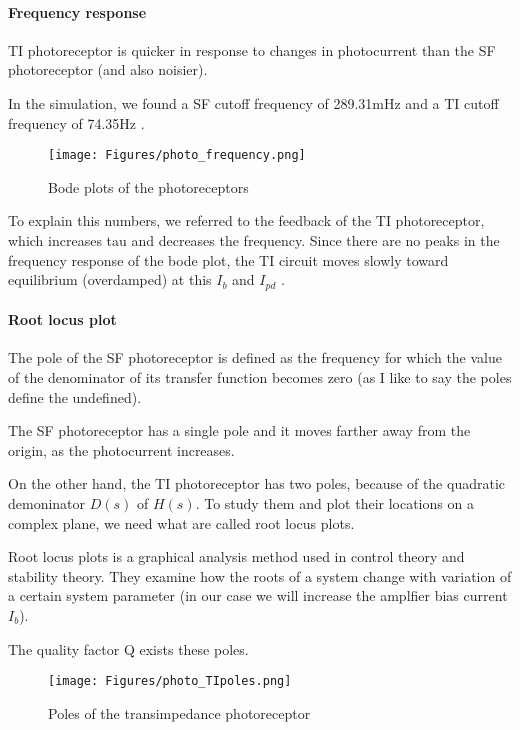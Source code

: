 \paragraph{Frequency response}

 TI photoreceptor is quicker in response to changes in photocurrent than the SF photoreceptor (and also noisier). 
 
In the simulation, we found a SF cutoff frequency of 289.31mHz and a TI cutoff frequency of 74.35Hz .

\begin{figure}[H]
    \centering
    \texttt{[image: Figures/photo\_frequency.png]}
    \caption{Bode plots of the photoreceptors}
    \label{fig:basalandcerebellum}
\end{figure}
 
To explain this numbers, we referred to the feedback of the TI photoreceptor, which increases tau and decreases the frequency. Since there are no peaks in the frequency response of the bode plot, the TI circuit moves slowly toward equilibrium (overdamped) at this $I_b$ and $I_{pd}$ .

\paragraph{Root locus plot}

The pole of the SF photoreceptor is defined as the frequency for which the value of the denominator of its transfer function becomes zero (as I like to say the poles define the undefined). 

The SF photoreceptor has a single pole and it moves farther away from the origin, as the photocurrent increases.  

On the other hand, the TI photoreceptor has two poles, because of the quadratic demoninator $D(s)$ of $H(s)$. To study them and plot their locations on a complex plane, we need what are called root locus plots. 

Root locus plots is a graphical analysis method used in control theory and stability theory. They examine how the roots of a system change with variation of a certain system parameter (in our case we will increase the amplfier bias current $I_b$).

The quality factor Q exists these poles. 

\begin{figure}[H]
    \centering
    \texttt{[image: Figures/photo\_TIpoles.png]}
    \caption{Poles of the transimpedance photoreceptor}
    \label{fig:basalandcerebellum}
\end{figure}

